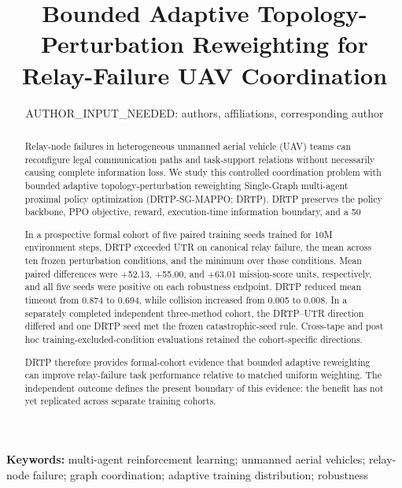 \documentclass[11pt,a4paper]{article}
\title{Bounded Adaptive Topology-Perturbation Reweighting for Relay-Failure UAV Coordination}
\author{AUTHOR\_INPUT\_NEEDED: authors, affiliations, corresponding author}
\date{}
\begin{document}
\maketitle
\begin{abstract}
Relay-node failures in heterogeneous unmanned aerial vehicle (UAV) teams can reconfigure legal communication paths and task-support relations without necessarily causing complete information loss. We study this controlled coordination problem with bounded adaptive topology-perturbation reweighting Single-Graph multi-agent proximal policy optimization (DRTP-SG-MAPPO; DRTP). DRTP preserves the policy backbone, PPO objective, reward, execution-time information boundary, and a 50%

In a prospective formal cohort of five paired training seeds trained for 10M environment steps, DRTP exceeded UTR on canonical relay failure, the mean across ten frozen perturbation conditions, and the minimum over those conditions. Mean paired differences were +52.13, +55.00, and +63.01 mission-score units, respectively, and all five seeds were positive on each robustness endpoint. DRTP reduced mean timeout from 0.874 to 0.694, while collision increased from 0.005 to 0.008. In a separately completed independent three-method cohort, the DRTP--UTR direction differed and one DRTP seed met the frozen catastrophic-seed rule. Cross-tape and post hoc training-excluded-condition evaluations retained the cohort-specific directions.

DRTP therefore provides formal-cohort evidence that bounded adaptive reweighting can improve relay-failure task performance relative to matched uniform weighting. The independent outcome defines the present boundary of this evidence: the benefit has not yet replicated across separate training cohorts.
\end{abstract}
\noindent\textbf{Keywords:} multi-agent reinforcement learning; unmanned aerial vehicles; relay-node failure; graph coordination; adaptive training distribution; robustness







\end{document}
